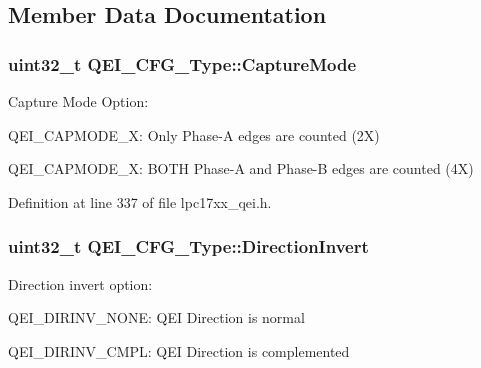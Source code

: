 \subsection{\-Member \-Data \-Documentation}
\hypertarget{struct_q_e_i___c_f_g___type_a0d5fa4810afb88f7cd9b27b9b12e033d}{
\subsubsection[{\-Capture\-Mode}]{\setlength{\rightskip}{0pt plus 5cm}uint32\-\_\-t {\bf \-Q\-E\-I\-\_\-\-C\-F\-G\-\_\-\-Type\-::\-Capture\-Mode}}}\label{struct_q_e_i___c_f_g___type_a0d5fa4810afb88f7cd9b27b9b12e033d}
\-Capture \-Mode \-Option\-:
\begin{DoxyItemize}
\item \-Q\-E\-I\-\_\-\-C\-A\-P\-M\-O\-D\-E\-\_\-X\-: \-Only \-Phase-\/\-A edges are counted (2\-X)
\item \-Q\-E\-I\-\_\-\-C\-A\-P\-M\-O\-D\-E\-\_\-X\-: \-B\-O\-T\-H \-Phase-\/\-A and \-Phase-\/\-B edges are counted (4\-X) 
\end{DoxyItemize}

\-Definition at line 337 of file lpc17xx\-\_\-qei.\-h.

\hypertarget{struct_q_e_i___c_f_g___type_a35b9e3c37c0a1e69f44f0180fa792c51}{
\subsubsection[{\-Direction\-Invert}]{\setlength{\rightskip}{0pt plus 5cm}uint32\-\_\-t {\bf \-Q\-E\-I\-\_\-\-C\-F\-G\-\_\-\-Type\-::\-Direction\-Invert}}}\label{struct_q_e_i___c_f_g___type_a35b9e3c37c0a1e69f44f0180fa792c51}
\-Direction invert option\-:
\begin{DoxyItemize}
\item \-Q\-E\-I\-\_\-\-D\-I\-R\-I\-N\-V\-\_\-\-N\-O\-N\-E\-: \-Q\-E\-I \-Direction is normal
\item \-Q\-E\-I\-\_\-\-D\-I\-R\-I\-N\-V\-\_\-\-C\-M\-P\-L\-: \-Q\-E\-I \-Direction is complemented 
\end{DoxyItemize}

